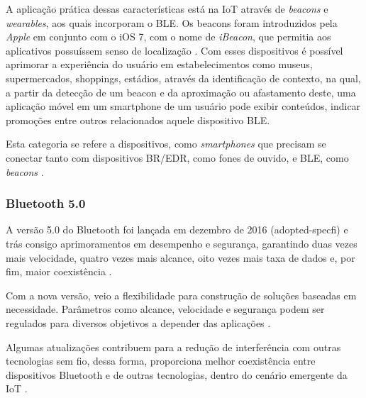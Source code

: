 \documentclass[
	article,			%
	11pt,				%
	oneside,			%
	a4paper,			%
	section=TITLE,		%
	subsection=TITLE,	%
	english,			%
	brazil,				%
	sumario=tradicional
	]{abntex2}
\begin{document}
A aplicação prática dessas características está na IoT através de \textit{beacons} e  
\textit{wearables}, aos quais incorporam o BLE. Os beacons foram introduzidos pela \textit{Apple} 
em conjunto com o iOS 7, com o nome de \textit{iBeacon}, que permitia aos aplicativos 
possuíssem senso de localização \cite{apple2014}. 
Com esses dispositivos é possível 
aprimorar a experiência do usuário em estabelecimentos como museus, supermercados, shoppings, 
estádios, através da identificação de contexto, na qual, a partir da 
detecção de um beacon e da aproximação ou afastamento deste, uma aplicação móvel em um smartphone 
de um usuário pode exibir conteúdos, indicar promoções entre outros relacionados aquele dispositivo 
BLE.


%
Esta categoria se refere a dispositivos, como \textit{smartphones} que precisam 
se conectar tanto com dispositivos BR/EDR, como fones de ouvido, e BLE, como 
\textit{beacons} \cite{sig2017}.

\subsubsection{Bluetooth 5.0}

A versão 5.0 do Bluetooth foi lançada em dezembro de 2016 (adopted-specfi) e trás consigo 
aprimoramentos em desempenho e segurança, garantindo duas vezes mais velocidade, quatro vezes mais 
alcance, oito vezes mais taxa de dados e, por fim, maior coexistência \cite{bluetoothsig2016}. 

Com a nova versão, veio a flexibilidade para construção de soluções baseadas em necessidade. 
Parâmetros como alcance, velocidade e segurança podem ser regulados para diversos objetivos a 
depender das aplicações \cite{bluetoothsig2016}.

Algumas atualizações contribuem para a redução de interferência com outras tecnologias sem fio, 
dessa forma, proporciona melhor coexistência entre dispositivos Bluetooth e de outras tecnologias, 
dentro do cenário emergente da IoT \cite{bluetoothsig2016}.
\end{document}
